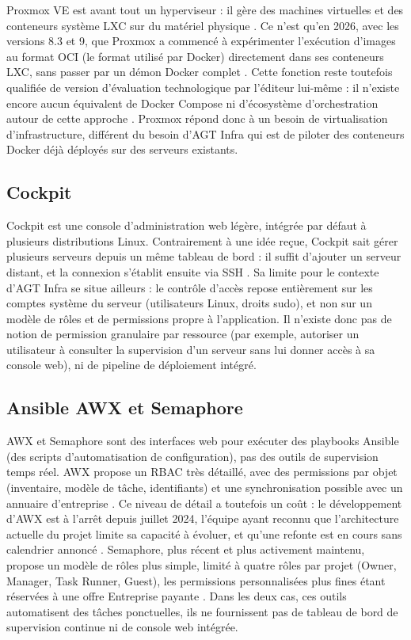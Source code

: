 Proxmox VE est avant tout un hyperviseur : il gère des machines virtuelles
et des conteneurs système LXC sur du matériel physique
\cite{proxmox_petronella}. Ce n'est qu'en 2026, avec les versions 8.3 et 9,
que Proxmox a commencé à expérimenter l'exécution d'images au format OCI
(le format utilisé par Docker) directement dans ses conteneurs LXC, sans
passer par un démon Docker complet \cite{proxmox_techfuel}. Cette fonction
reste toutefois qualifiée de version d'évaluation technologique par
l'éditeur lui-même : il n'existe encore aucun équivalent de Docker Compose
ni d'écosystème d'orchestration autour de cette approche
\cite{proxmox_techfuel, proxmox_mrplanb}. Proxmox répond donc à un besoin
de virtualisation d'infrastructure, différent du besoin d'AGT Infra qui est
de piloter des conteneurs Docker déjà déployés sur des serveurs existants.

\subsection{Cockpit}

Cockpit est une console d'administration web légère, intégrée par défaut à
plusieurs distributions Linux. Contrairement à une idée reçue, Cockpit sait
gérer plusieurs serveurs depuis un même tableau de bord : il suffit
d'ajouter un serveur distant, et la connexion s'établit ensuite via SSH
\cite{cockpit_redhat, cockpit_rhel}. Sa limite pour le contexte d'AGT Infra
se situe ailleurs : le contrôle d'accès repose entièrement sur les comptes
système du serveur (utilisateurs Linux, droits sudo), et non sur un modèle
de rôles et de permissions propre à l'application. Il n'existe donc pas de
notion de permission granulaire par ressource (par exemple, autoriser un
utilisateur à consulter la supervision d'un serveur sans lui donner accès
à sa console web), ni de pipeline de déploiement intégré.

\subsection{Ansible AWX et Semaphore}

AWX et Semaphore sont des interfaces web pour exécuter des playbooks
Ansible (des scripts d'automatisation de configuration), pas des outils de
supervision temps réel. AWX propose un RBAC très détaillé, avec des
permissions par objet (inventaire, modèle de tâche, identifiants) et une
synchronisation possible avec un annuaire d'entreprise
\cite{semaphore_awx_2026}. Ce niveau de détail a toutefois un coût : le
développement d'AWX est à l'arrêt depuis juillet 2024, l'équipe ayant
reconnu que l'architecture actuelle du projet limite sa capacité à évoluer,
et qu'une refonte est en cours sans calendrier annoncé
\cite{semaphore_awx_2026, rogerperkin_awx}. Semaphore, plus récent et plus
activement maintenu, propose un modèle de rôles plus simple, limité à
quatre rôles par projet (Owner, Manager, Task Runner, Guest), les
permissions personnalisées plus fines étant réservées à une offre
Entreprise payante \cite{semaphore_vs_awx, rogerperkin_awx}. Dans les deux
cas, ces outils automatisent des tâches ponctuelles, ils ne fournissent pas
de tableau de bord de supervision continue ni de console web intégrée.

